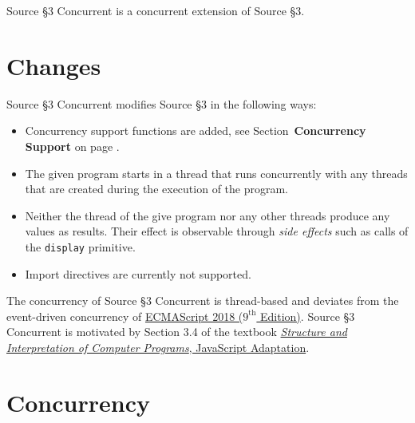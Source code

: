 





Source \S 3 Concurrent is a concurrent extension of Source \S 3.

\section{Changes}

Source \S 3 Concurrent modifies Source \S 3 in the following ways:
\begin{itemize}
\item Concurrency support functions are added, see Section~\textbf{Concurrency Support} on page \pageref{conc_supp}.
\item The given program starts in a thread that runs concurrently with any
  threads that are created during the execution of the program.
\item Neither the thread of the give program nor any other threads produce
  any values as results. Their effect is observable through \emph{side effects}
  such as calls of the \lstinline{display} primitive.
  \item Import directives are currently not supported.
\end{itemize}
\noindent
The concurrency of Source \S 3 Concurrent is thread-based and deviates
from the event-driven concurrency of
\href{http://www.ecma-international.org/publications/files/ECMA-ST/Ecma-262.pdf}{\color{DarkBlue}
  ECMAScript 2018 ($9^{\textrm{th}}$ Edition)}. Source \S 3 Concurrent is
motivated by Section 3.4 of the textbook
\href{https://sourceacademy.org/sicpjs}{\color{DarkBlue}\emph{Structure and Interpretation
of Computer Programs}, JavaScript Adaptation}.

\section{Concurrency}

